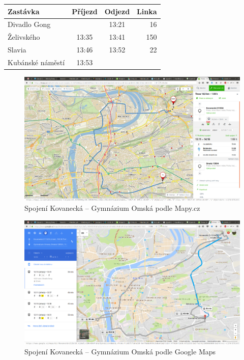 \begin{tabular}{|l|c|c|r|}\hline
{\bf Zastávka}&{\bf Příjezd}&{\bf Odjezd}&{\bf Linka}\\\hline
Divadlo Gong&&13:21&16\\\hline
Želivského&13:35&13:41&150\\\hline
Slavia&13:46&13:52&22\\\hline
Kubánské náměstí&13:53&&\\\hline
\end{tabular} 
\begin{figure}[h]
  \centering
    \includegraphics[width=\textwidth]{../img/kovanecka-omska-seznam.png}
  \caption{Spojení Kovanecká -- Gymnázium Omská podle Mapy.cz}
  \label{fig:kovanecka-omska-seznam}
\end{figure}
\begin{figure}[h]
  \centering
    \includegraphics[width=\textwidth]{../img/kovanecka-omska-google.png}
  \caption{Spojení Kovanecká -- Gymnázium Omská podle Google Maps}
  \label{fig:kovanecka-omska-google}
\end{figure}

